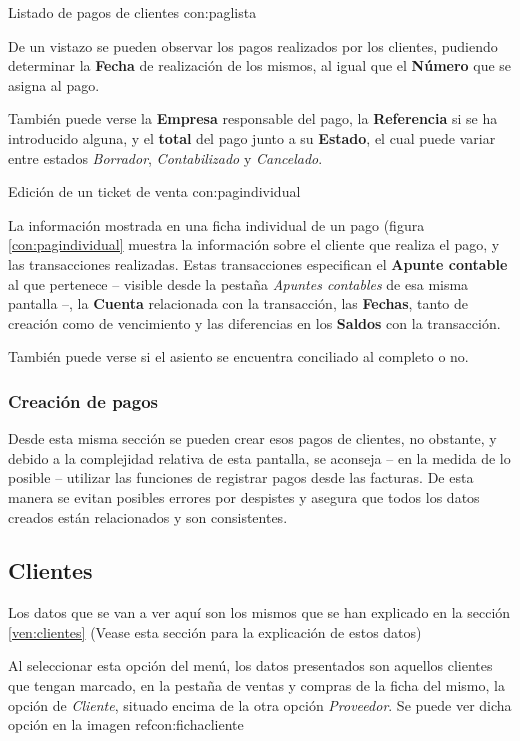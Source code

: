 {Listado de pagos de clientes}
{con:paglista}

De un vistazo se pueden observar los pagos realizados por los clientes, pudiendo determinar la \textbf{Fecha} de realización de los mismos, al igual que el \textbf{Número} que se asigna al pago.

También puede verse la \textbf{Empresa} responsable del pago, la \textbf{Referencia} si se ha introducido alguna, y el \textbf{total} del pago junto a su \textbf{Estado}, el cual puede variar entre estados \emph{Borrador}, \emph{Contabilizado} y \emph{Cancelado}.

{Edición de un ticket de venta}
{con:pagindividual}

La información mostrada en una ficha individual de un pago (figura \ref{con:pagindividual} muestra la información sobre el cliente que realiza el pago, y las transacciones realizadas. Estas transacciones especifican el \textbf{Apunte contable} al que pertenece -- visible desde la pestaña \emph{Apuntes contables} de esa misma pantalla --, la \textbf{Cuenta} relacionada con la transacción, las \textbf{Fechas}, tanto de creación como de vencimiento y las diferencias en los \textbf{Saldos} con la transacción.

También puede verse si el asiento se encuentra conciliado al completo o no.


\subsubsection{Creación de pagos}

Desde esta misma sección se pueden crear esos pagos de clientes, no obstante, y debido a la complejidad relativa de esta pantalla, se aconseja -- en la medida de lo posible -- utilizar las funciones de registrar pagos desde las facturas. De esta manera se evitan posibles errores por despistes y asegura que todos los datos creados están relacionados y son consistentes.





\subsection{Clientes}
Los datos que se van a ver aquí son los mismos que se han explicado en la sección \ref{ven:clientes} (Vease esta sección para la explicación de estos datos)

Al seleccionar esta opción del menú, los datos presentados son aquellos clientes que tengan marcado, en la pestaña de ventas y compras de la ficha del mismo, la opción de \emph{Cliente}, situado encima de la otra opción \emph{Proveedor}. Se puede ver dicha opción en la imagen ref{con:fichacliente}

